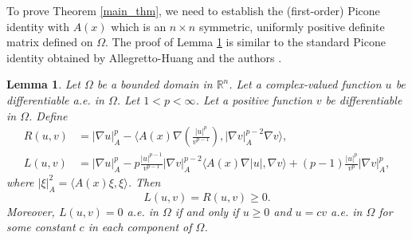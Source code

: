 \documentclass[a4paper,12pt,reqno]{amsart}
\theoremstyle{theorem}
\numberwithin{equation}{section}
\theoremstyle{plain}
\newtheorem{lem}[thm]{Lemma}
\theoremstyle{definition}
\theoremstyle{defi}
\begin{document}
To prove Theorem \ref{main_thm}, we need to establish the (first-order) Picone identity with $A(x)$ which is an $n\times n$ symmetric, uniformly positive definite matrix defined on $\Omega$. The proof of Lemma \ref{lem_Picone} is similar to the standard Picone identity obtained by Allegretto-Huang \cite{AH98} and the authors \cite{RSS_NoDEA}.
\begin{lem}\label{lem_Picone}
	Let $\Omega$ be a bounded domain in $\mathbb{R}^n$.
	Let a complex-valued function $u$ be differentiable a.e. in $\Omega$. Let $1<p<\infty$. Let a positive function $v$ be differentiable in $\Omega$. Define 
	\begin{align}
	R(u,v) &= |\nabla u|^p_A - \langle A(x)\nabla\left(\frac{|u|^p}{v^{p-1}} \right),|\nabla v|^{p-2}_A\nabla v\rangle, \\
	L(u,v) &= |\nabla u|^p_A -p\frac{|u|^{p-1} }{v^{p-1}}|\nabla v|^{p-2}_A \langle A(x)\nabla|u|, \nabla v \rangle + (p-1)\frac{|u|^p}{v^p}|\nabla v|^p_A,
	\end{align} 
	where $|\xi|^2_A= \langle A(x)\xi,\xi\rangle$. Then 
	\begin{equation*}
	L(u,v) =R(u,v)\geq 0.
	\end{equation*}
	Moreover, $L(u,v)=0$ a.e. in $\Omega$ if and only if $u\geq 0$ and $u=cv$ a.e. in $\Omega$ for some constant $c$ in each component of $\Omega$.	
\end{lem}
\end{document}
